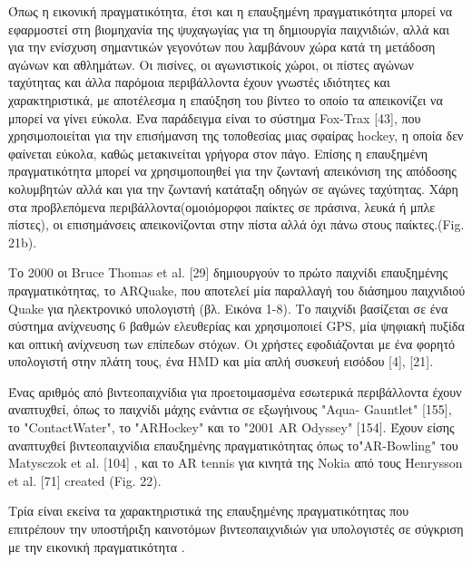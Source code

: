 Όπως η εικονική πραγματικότητα, έτσι και η επαυξημένη πραγματικότητα μπορεί να εφαρμοστεί στη βιομηχανία της ψυχαγωγίας για τη δημιουργία παιχνιδιών, αλλά και για την ενίσχυση  σημαντικών γεγονότων που λαμβάνουν χώρα κατά τη μετάδοση αγώνων και αθλημάτων. 
Οι πισίνες, οι αγωνιστικοίς χώροι, οι πίστες αγώνων ταχύτητας και άλλα παρόμοια περιβάλλοντα έχουν γνωστές ιδιότητες και χαρακτηριστικά, με αποτέλεσμα η επαύξηση του βίντεο το οποίο τα απεικονίζει να μπορεί να γίνει εύκολα. Ένα παράδειγμα είναι το σύστημα Fox-Trax [43], που χρησιμοποιείται για την επισήμανση της τοποθεσίας μιας σφαίρας hockey, η οποία δεν φαίνεται εύκολα, καθώς μετακινείται γρήγορα στον πάγο. Επίσης η επαυξημένη πραγματικότητα μπορεί να χρησιμοποιηθεί για την ζωντανή απεικόνιση της απόδοσης κολυμβητών αλλά και για την ζωντανή κατάταξη οδηγών σε αγώνες ταχύτητας.  Χάρη στα προβλεπόμενα περιβάλλοντα(ομοιόμορφοι παίκτες σε πράσινα, λευκά ή μπλε πίστες), οι επισημάνσεις απεικονίζονται στην πίστα αλλά όχι πάνω στους παίκτες.(Fig. 21b).



Το 2000 οι Bruce Thomas et al. [29] δημιουργούν το πρώτο παιχνίδι επαυξημένης πραγματικότητας, το ARQuake, που αποτελεί μία παραλλαγή του διάσημου παιχνιδιού Quake για ηλεκτρονικό υπολογιστή (βλ. Εικόνα 1-8). Το παιχνίδι βασίζεται σε ένα σύστημα ανίχνευσης 6 βαθμών ελευθερίας και χρησιμοποιεί GPS, μία ψηφιακή πυξίδα και οπτική ανίχνευση των επίπεδων στόχων. Οι χρήστες εφοδιάζονται με ένα φορητό υπολογιστή στην πλάτη τους, ένα HMD και μία απλή συσκευή εισόδου [4], [21].

Ένας αριθμός από βιντεοπαιχνίδια για προετοιμασμένα εσωτερικά περιβάλλοντα έχουν αναπτυχθεί, όπως το παιχνίδι μάχης ενάντια σε εξωγήινους "Aqua-
Gauntlet" [155], το "ContactWater", το "ARHockey" και το "2001 AR Odyssey" [154]. Έχουν είσης αναπτυχθεί βιντεοπαιχνίδια επαυξημένης πραγματικότητας όπως το"AR-Bowling" του Matysczok et al. [104] , και το AR tennis για κινητά της Nokia από τους Henrysson et al. [71] created  (Fig. 22).



Τρία είναι εκείνα τα χαρακτηριστικά της επαυξημένης πραγματικότητας που επιτρέπουν την υποστήριξη καινοτόμων βιντεοπαιχνιδιών για υπολογιστές σε σύγκριση με την εικονική πραγματικότητα \cite{Thomas2012}.

